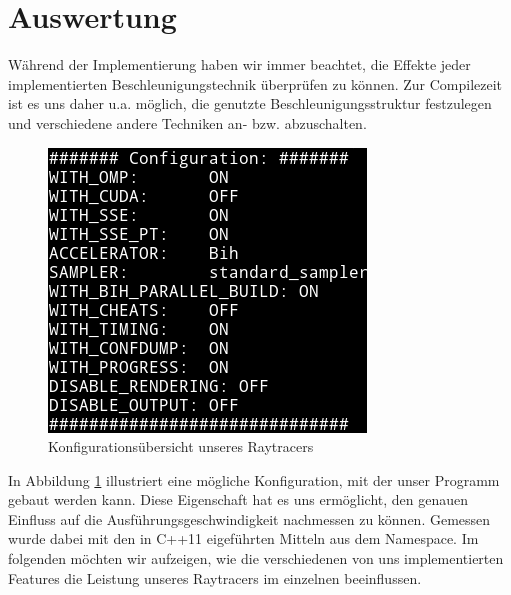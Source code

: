 \section{Auswertung}
Während der Implementierung haben wir immer beachtet, die Effekte jeder implementierten Beschleunigungstechnik überprüfen zu können.
Zur Compilezeit ist es uns daher u.a. möglich, die genutzte Beschleunigungsstruktur festzulegen und verschiedene andere Techniken an- bzw. abzuschalten.
\begin{figure}
  \center
  \includegraphics[width=.6\textwidth]{images/configuration.png}
  \caption{Konfigurationsübersicht unseres Raytracers}
  \label{fig:pray_config}
\end{figure}
In Abbildung \ref{fig:pray_config} illustriert eine mögliche Konfiguration, mit der unser Programm gebaut werden kann.
Diese Eigenschaft hat es uns ermöglicht, den genauen Einfluss auf die Ausführungsgeschwindigkeit nachmessen zu können.
Gemessen wurde dabei mit den in C++11 eigeführten Mitteln aus dem  Namespace.
Im folgenden möchten wir aufzeigen, wie die verschiedenen von uns implementierten Features die Leistung unseres Raytracers im einzelnen beeinflussen.

